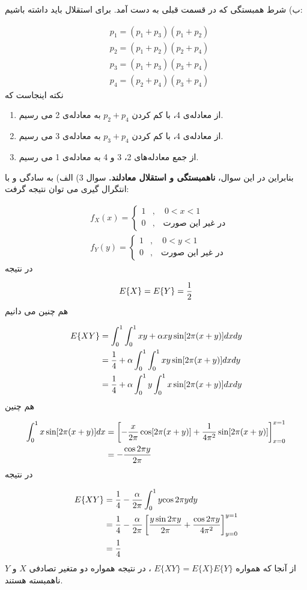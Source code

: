 \documentclass[10pt,letterpaper]{article}
\newcommand{\eqn}[1]{
\begin{equation}
\begin{split}
#1
\end{split}
\end{equation}
}
\begin{document}
ب) شرط همبستگی که در قسمت قبلی به دست آمد. برای استقلال باید داشته باشیم:
\eqn{
&p_1=(p_1+p_3)(p_1+p_2)
\\&p_2=(p_1+p_2)(p_2+p_4)
\\&p_3=(p_1+p_3)(p_3+p_4)
\\&p_4=(p_2+p_4)(p_3+p_4)
}{}
نکته اینجاست که
\begin{enumerate}
\item
از معادله‌ی 4، با کم کردن 
$
p_2+p_4
$
 به معادله‌ی 2 می رسیم.
\item
از معادله‌ی 4، با کم کردن 
$
p_3+p_4
$
 به معادله‌ی 3 می رسیم.
\item
از جمع معادله‌های 2، 3 و 4 به معادله‌ی 1 می رسیم.
\end{enumerate}
بنابراین در این سوال، 
\textbf{
ناهمبستگی و استقلال معادلند.
}
\newline\newline
سوال 3) الف) به سادگی و با انتگرال گیری می توان نتیجه گرفت:
\eqn{
&f_X(x)=\begin{cases}
1&,\quad 0<x<1
\\0&,\quad \text{در غیر این صورت}
\end{cases}
\\&f_Y(y)=\begin{cases}
1&,\quad 0<y<1
\\0&,\quad \text{در غیر این صورت}
\end{cases}
}{}
در نتیجه
\eqn{
E\{X\}=E\{Y\}={1\over 2}
}{}
هم چنین می دانیم
\eqn{
E\{XY\}&=\int_0^1\int_0^1 xy+\alpha xy\sin[2\pi(x+y)]dxdy
\\&={1\over 4}+\alpha\int_0^1\int_0^1 xy\sin[2\pi(x+y)]dxdy
\\&={1\over 4}+\alpha\int_0^1y\int_0^1 x\sin[2\pi(x+y)]dxdy
}{}
هم چنین
\eqn{
\int_0^1 x\sin[2\pi(x+y)]dx&=\left[-{x\over 2\pi}\cos[2\pi(x+y)]+{1\over 4\pi^2}\sin[2\pi(x+y)]\right]_{x=0}^{x=1}
\\&=-{\cos 2\pi y\over 2\pi}
}{}
در نتیجه
\eqn{
E\{XY\}&=
{1\over 4}-{\alpha\over 2\pi}\int_0^1y{\cos 2\pi y}dy
\\&={1\over 4}-{\alpha\over 2\pi}\left[{y\sin 2\pi y\over 2\pi}+{\cos 2\pi y\over 4\pi^2}\right]_{y=0}^{y=1}
\\&={1\over 4}
}{}
از آنجا که همواره 
$
E\{XY\}=E\{X\}E\{Y\}
$
، در نتیجه همواره دو متغیر تصادفی $X$ و $Y$ ناهمبسته هستند.
\end{document}
